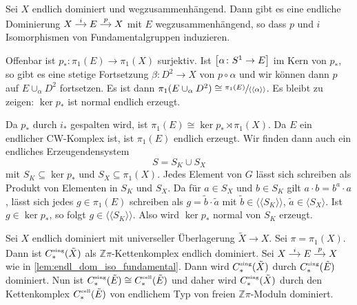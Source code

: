 \begin{lemma}[label=lem:endl_dom_iso_fundamental]
	Sei $X$ endlich dominiert und wegzusammenhängend.
	Dann gibt es eine endliche Dominierung 
	\(
		\begin{tikzcd}[cramped,sep=small] 
			X \rar["i"] & E \rar["p"] & X 
		\end{tikzcd}
	\)
	mit $E$ wegzusammenhängend, so dass $p$ und $i$ Isomorphismen von Fundamentalgruppen induzieren.
\end{lemma}
\begin{beweis}
	Offenbar ist $p_* \colon \pi_1(E) \to \pi_1(X)$ surjektiv.
	Ist $\benbrace*{\alpha \colon S^1 \to E}$ im Kern von $p_*$, so gibt es eine stetige Fortsetzung $\beta \colon D^2 \to X$ von $p \circ \alpha$ und wir können dann $p$ auf $E \cup_\alpha D^2$ fortsetzen.
	Es ist dann $\pi_1(E \cup_\alpha D^2) \cong \sfrac{\pi_1(E)}{\langle\langle \alpha\rangle\rangle}$.
	Es bleibt zu zeigen: $\ker p_*$ ist normal endlich erzeugt.
	
	Da $p_*$ durch $i_*$ gespalten wird, ist $\pi_1(E) \cong \ker p_* \rtimes \pi_1(X)$.
	Da $E$ ein endlicher CW-Komplex ist, ist $\pi_1(E)$ endlich erzeugt.
	Wir finden dann auch ein endliches Erzeugendensystem 
	\[
		S = S_K \cup S_X
	\]
	mit $S_K \subseteq \ker p_*$ und $S_X \subseteq \pi_1(X)$.
	Jedes Element von $G$ lässt sich schreiben als Produkt von Elementen in $S_K$ und $S_X$.
	Da für $a \in S_X$ und $b \in S_K$ gilt $a \cdot b = b^a \cdot a$, lässt sich jedes $g \in \pi_1(E)$ schreiben als $g = \tilde{b} \cdot \tilde{a}$ mit $\tilde{b} \in \langle\langle S_K \rangle\rangle$, $\tilde{a} \in \langle S_X \rangle$.
	Ist $g \in \ker p_*$, so folgt $g \in \langle\langle S_K \rangle\rangle$.
	Also wird $\ker p_*$ normal von $S_K$ erzeugt.
\end{beweis}

\begin{bemerkung}
	Sei $X$ endlich dominiert mit universeller Überlagerung $\tilde{X} \to X$.
	Sei $\pi = \pi_1(X)$.
	Dann ist $C^\sing_*(\tilde{X})$ als $\mathbb{Z}\pi$-Kettenkomplex endlich dominiert.
	Sei \(
		\begin{tikzcd}[cramped,sep=small] 
			X \rar["i"] & E \rar["p"] & X 
		\end{tikzcd}
	\) wie in \autoref{lem:endl_dom_iso_fundamental}.
	Dann wird $C^\sing_*(\tilde{X})$ durch $C^\sing_*(\tilde{E})$ dominiert.
	Nun ist $C^\sing_*(\tilde{E}) \cong C^{\cell}_*(\tilde{E})$ und daher wird $C^\sing_*(\tilde{X})$ durch den Kettenkomplex $C^{\cell}_*(\tilde{E})$ von endlichem Typ von freien $\mathbb{Z}\pi$-Moduln dominiert.
\end{bemerkung}

